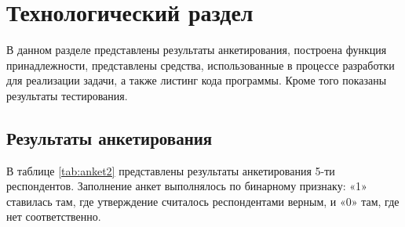 \chapter{Технологический раздел}
\label{cha:technological}

    В данном разделе представлены результаты анкетирования, построена функция принадлежности, представлены средства, использованные в процессе разработки для реализации задачи, а также листинг кода программы. Кроме того показаны результаты тестирования.

    \section{Результаты анкетирования}
    \par В таблице \ref{tab:anket2} представлены результаты анкетирования 5-ти респондентов. Заполнение анкет выполнялось по бинарному признаку: «1» ставилась там, где утверждение считалось респондентами верным, и «0» там, где нет соответственно.
